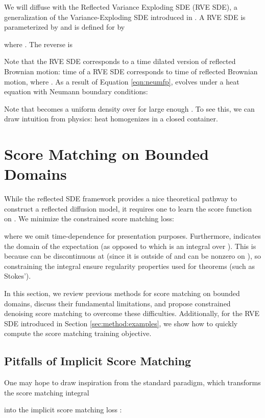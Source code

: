 \documentclass{article}
\theoremstyle{plain}
\theoremstyle{definition}
\theoremstyle{remark}
\begin{document}
We will diffuse with the  Reflected Variance Exploding SDE (RVE SDE), a generalization of the Variance-Exploding SDE introduced in \citet{Song2020ScoreBasedGM}. A RVE SDE is parameterized by  and is defined for  by

where . The reverse is

Note that the RVE SDE corresponds to a time dilated version of reflected Brownian motion: time  of a RVE SDE corresponds to time  of reflected Brownian motion, where . As a result of Equation \ref{eqn:neumfp},  evolves under a heat equation with Neumann boundary conditions:

Note that  becomes a uniform density over  for large enough . To see this, we can draw intuition from physics: heat homogenizes in a closed container.

 \section{Score Matching on Bounded Domains}\label{sec:scorematching}

While the reflected SDE framework provides a nice theoretical pathway to construct a reflected diffusion model, it requires one to learn the score function  on . We minimize the constrained score matching loss:

where we omit time-dependence for presentation purposes. Furthermore,  indicates the domain of the expectation (as opposed to  which is an integral over ). This is because  can be discontinuous at  (since it is  outside of  and can be nonzero on ), so constraining the integral ensure regularity properties used for theorems (such as Stokes').

In this section, we review previous methods for score matching on bounded domains, discuss their fundamental limitations, and propose constrained denoising score matching to overcome these difficulties. Additionally, for the RVE SDE introduced in Section \ref{sec:method:examples}, we show how to quickly compute the score matching training objective.

\subsection{Pitfalls of Implicit Score Matching}

One may hope to draw inspiration from the standard paradigm, which transforms the score matching integral

into the implicit score matching loss \citep{Hyvrinen2005EstimationON}:
\end{document}
